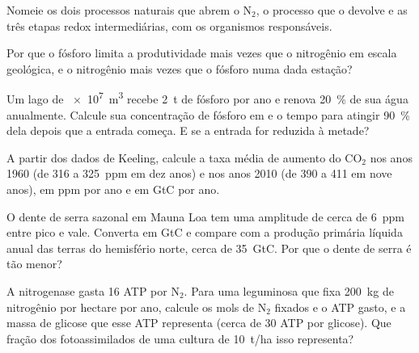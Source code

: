 \begin{exercise}[$\star$]\label{exo:b2:biogeochemical-cycles:3}
Nomeie os dois processos naturais que abrem o $\mathrm{N_2}$, o processo que
o devolve e as três etapas redox intermediárias, com os organismos
responsáveis.
\end{exercise}

\begin{exercise}[$\star$]\label{exo:b2:biogeochemical-cycles:4}
Por que o fósforo limita a produtividade mais vezes que o nitrogênio em
escala geológica, e o nitrogênio mais vezes que o fósforo numa dada
estação?
\end{exercise}

\begin{exercise}[$\star\star$]\label{exo:b2:biogeochemical-cycles:5}
Um lago de \qty{e7}{m^3} recebe \qty{2}{t} de fósforo por ano e renova
\qty{20}{\%} de sua água anualmente. Calcule sua concentração de
fósforo em  e o tempo para atingir \qty{90}{\%}
dela depois que a entrada começa. E se a entrada for reduzida à metade?
\end{exercise}

\begin{exercise}[$\star\star$]\label{exo:b2:biogeochemical-cycles:6}
A partir dos dados de Keeling, calcule a taxa média de aumento do $\mathrm{CO_2}$ nos
anos 1960 (de 316 a \qty{325}{ppm} em dez anos) e nos anos 2010 (de 390
a 411 em nove anos), em ppm por ano e em GtC por ano.
\end{exercise}

\begin{exercise}[$\star\star$]\label{exo:b2:biogeochemical-cycles:7}
O dente de serra sazonal em Mauna Loa tem uma amplitude de cerca de
\qty{6}{ppm} entre pico e vale. Converta em GtC e compare com a produção
primária líquida anual das terras do hemisfério norte, cerca de
\qty{35}{GtC}. Por que o dente de serra é tão menor?
\end{exercise}

\begin{exercise}[$\star\star$]\label{exo:b2:biogeochemical-cycles:8}
A nitrogenase gasta 16 ATP por $\mathrm{N_2}$. Para uma leguminosa que fixa
\qty{200}{kg} de nitrogênio por hectare por ano, calcule os mols de
$\mathrm{N_2}$ fixados e o ATP gasto, e a massa de glicose que esse ATP
representa (cerca de 30 ATP por glicose). Que fração dos fotoassimilados
de uma cultura de \qty{10}{t/ha} isso representa?
\end{exercise}

